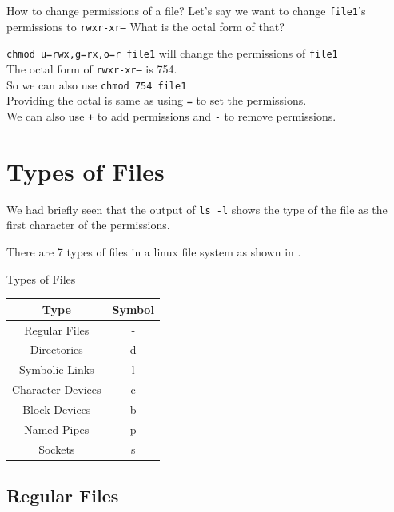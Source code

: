 \begin{qs}
  How to change permissions of a file?
  Let's say we want to change \texttt{file1}'s permissions to \texttt{rwxr-xr--}
  What is the octal form of that?
\end{qs}

\begin{ans}
  \texttt{chmod u=rwx,g=rx,o=r file1} will change the permissions of \texttt{file1}\\
  The octal form of \texttt{rwxr-xr--} is 754.\\
  So we can also use \texttt{chmod 754 file1}\\
  Providing the octal is same as using \texttt{=} to set the permissions.\\
  We can also use \texttt{+} to add permissions and \texttt{-} to remove permissions.
\end{ans}


\vfill
\pagebreak
\section{Types of Files}

We had briefly seen that the output of \texttt{ls -l} shows the type of the file as the first character of the permissions.

There are 7 types of files in a linux file system as shown in .

\begin{margintable}
\caption{Types of Files}
\begin{tabular}{ c c }
  \toprule
  Type & Symbol \\
 \midrule
  Regular Files & -{} \\
  Directories & d \\
  Symbolic Links & l \\
  Character Devices & c \\
  Block Devices & b \\
  Named Pipes & p \\
  Sockets & s \\
 \bottomrule
\end{tabular}
\end{margintable}

\subsection{Regular Files}


